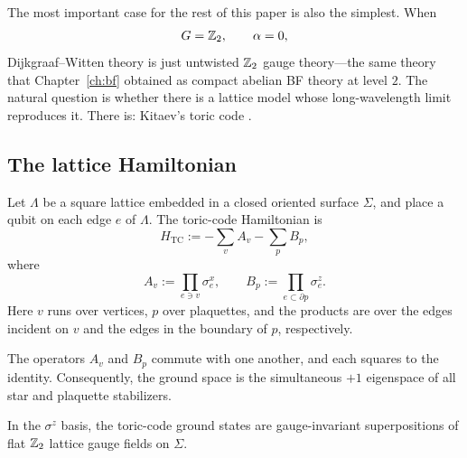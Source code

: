 The most important case for the rest of this paper is also the simplest.  When
\begin{equation*}
G=\mathbb{Z}_2,
\qquad
\alpha=0,
\end{equation*}
Dijkgraaf--Witten theory is just untwisted $\mathbb{Z}_2$ gauge theory---the same theory that Chapter~\ref{ch:bf} obtained as compact abelian BF theory at level $2$.  The natural question is whether there is a lattice model whose long-wavelength limit reproduces it.  There is: Kitaev's toric code \cite{Kitaev2003}.

\subsection{The lattice Hamiltonian}

\begin{definition}\label{def:toric-code}
Let $\Lambda$ be a square lattice embedded in a closed oriented surface $\Sigma$, and place a qubit on each edge $e$ of $\Lambda$. The toric-code Hamiltonian is
\begin{equation}\label{eq:toric-hamiltonian}
H_{\mathrm{TC}}
:=
-\sum_v A_v-\sum_p B_p,
\end{equation}
where
\begin{equation}\label{eq:toric-stabilizers}
A_v:=\prod_{e\ni v}\sigma_e^x,
\qquad
B_p:=\prod_{e\subset \partial p}\sigma_e^z.
\end{equation}
Here $v$ runs over vertices, $p$ over plaquettes, and the products are over the edges incident on $v$ and the edges in the boundary of $p$, respectively.
\end{definition}

\noindent The operators $A_v$ and $B_p$ commute with one another, and each squares to the identity. Consequently, the ground space is the simultaneous $+1$ eigenspace of all star and plaquette stabilizers.

\begin{proposition}\label{prop:toric-z2}
In the $\sigma^z$ basis, the toric-code ground states are gauge-invariant superpositions of flat $\mathbb{Z}_2$ lattice gauge fields on $\Sigma$.
\end{proposition}


